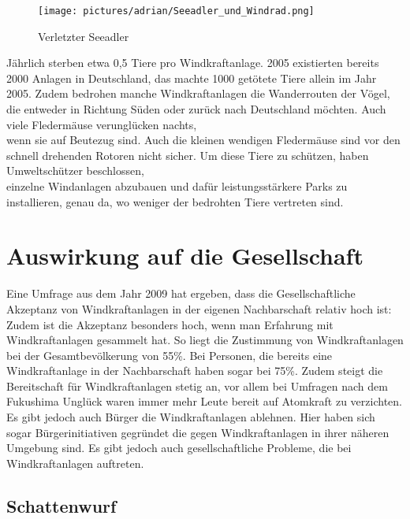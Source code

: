 \documentclass[12pt]{scrbook}
\begin{document}
\begin{wrapfigure}[19]{r}{0.61\textwidth}
 	\vspace{-20pt}
	\centering
    \texttt{[image: pictures/adrian/Seeadler\_und\_Windrad.png]}
  	\caption{Verletzter Seeadler}
  	\label{pic:Verletzter Seeadler}
\end{wrapfigure}
Jährlich sterben etwa 0,5 Tiere pro Windkraftanlage. 2005 existierten bereits
2000 Anlagen in Deutschland, das machte 1000 getötete Tiere allein im Jahr
2005. Zudem bedrohen manche Windkraftanlagen die Wanderrouten der Vögel, die
entweder in Richtung Süden oder zurück nach Deutschland möchten. Auch viele
Fledermäuse verunglücken nachts, \\
wenn sie auf Beutezug sind. Auch die kleinen
wendigen Fledermäuse sind vor den schnell drehenden Rotoren nicht sicher. Um
diese Tiere zu schützen, haben Umweltschützer beschlossen, \\
einzelne Windanlagen abzubauen und dafür leistungsstärkere Parks zu installieren, genau
da, wo weniger der bedrohten Tiere vertreten sind.


\newpage


\section{Auswirkung auf die Gesellschaft}

Eine Umfrage aus dem Jahr 2009 hat ergeben, dass die Gesellschaftliche
Akzeptanz von Windkraftanlagen in der eigenen Nachbarschaft relativ hoch ist:
Zudem ist die Akzeptanz besonders hoch, wenn man Erfahrung mit
Windkraftanlagen gesammelt hat. So liegt die Zustimmung von Windkraftanlagen
bei der Gesamtbevölkerung von 55\%. Bei Personen, die bereits eine
Windkraftanlage in der Nachbarschaft haben sogar bei 75\%. Zudem steigt die
Bereitschaft für Windkraftanlagen stetig an, vor allem bei Umfragen nach dem
Fukushima Unglück waren immer mehr Leute bereit auf Atomkraft zu verzichten.
Es gibt jedoch auch Bürger die Windkraftanlagen ablehnen. Hier haben sich
sogar Bürgerinitiativen gegründet die gegen Windkraftanlagen in ihrer näheren
Umgebung sind. Es gibt jedoch auch gesellschaftliche Probleme, die bei
Windkraftanlagen auftreten.


\subsection{Schattenwurf}
\end{document}
